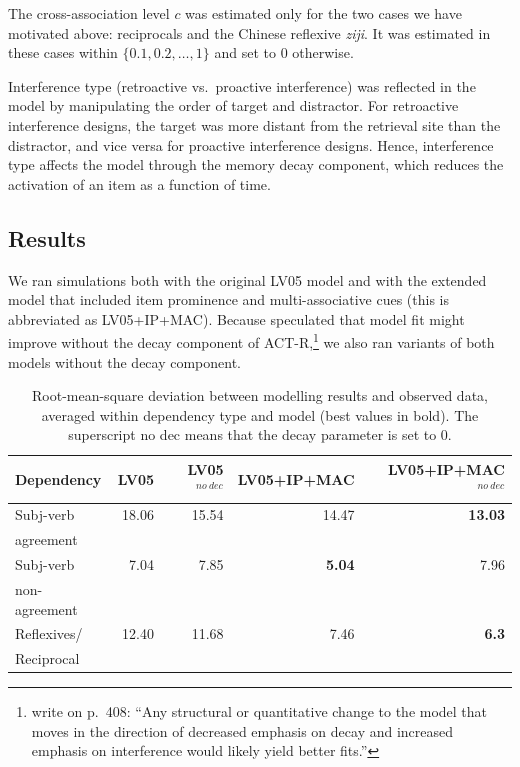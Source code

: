 \documentclass{cambridge7A}\usepackage[]{graphicx}\usepackage[]{color}
\begin{document}
The cross-association level $c$ was estimated only for the two cases we have motivated above: reciprocals and the Chinese reflexive \textit{ziji}. It was estimated in these cases within $\{0.1, 0.2, \dots, 1\}$ and set to $0$ otherwise.

Interference type  (retroactive vs.\ proactive interference) was reflected in the model by manipulating the order of target and distractor. For  retroactive interference designs, the target was more distant from the retrieval site than the distractor, and vice versa for  proactive interference designs. Hence, interference type affects the model through the memory decay component, which reduces the activation of an item as a function of time.

\subsection{Results}
We ran simulations both with the original LV05 model and with the extended model that included item  prominence and  multi-associative cues (this is abbreviated as LV05+IP+MAC).
Because \cite{LewisVasishth2005} speculated that model fit might improve without the decay component of ACT-R,\footnote{
    \cite{LewisVasishth2005} write on p.\ 408: ``Any structural or quantitative change to the model that moves in the direction of decreased emphasis on decay and increased emphasis on interference would likely yield better fits.''}
we also ran variants of both models without the decay component.



\begin{table}[!htbp]
\centering
\begin{tabular}{lrrrr}
Dependency & LV05 & LV05$^{no\ dec}$ & LV05+IP+MAC & LV05+IP+MAC$^{no\ dec}$ \\ 
\hline
Subj-verb & 18.06 & 15.54 & 14.47 & \textbf{13.03} \\ 
agreement & & & & \\
  Subj-verb & 7.04 & 7.85 & \textbf{5.04} & 7.96 \\ 
non-agreement & & & & \\
  Reflexives/ & 12.40 & 11.68 & 7.46 & \textbf{6.3} \\ 
Reciprocal & & & & \\  
\hline
\end{tabular}
\caption{Root-mean-square deviation between modelling results and observed data, averaged within dependency type and model (best values in bold). The superscript no dec means that the decay parameter is set to 0.} \label{tab:simfit}
\end{table}
\end{document}
